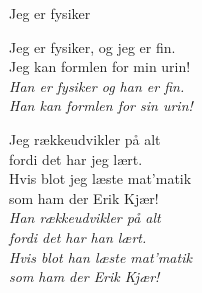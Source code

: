 \begin{song}{Jeg er fysiker}
  \begin{SBChorus}
    Jeg er fysiker, og jeg er fin.\\
    Jeg kan formlen for min urin!\\
    \emph{Han er fysiker og han er fin.\\
    Han kan formlen for sin urin!}
  \end{SBChorus}

  \begin{SBVerse}
    Jeg rækkeudvikler på alt\\
    fordi det har jeg lært.\\
    Hvis blot jeg læste mat'matik\\
    som ham der Erik Kjær!\\\medskip
    \emph{Han rækkeudvikler på alt\\
    fordi det har han lært.\\
    Hvis blot han læste mat'matik\\
    som ham der Erik Kjær!}
  \end{SBVerse}
\end{song}